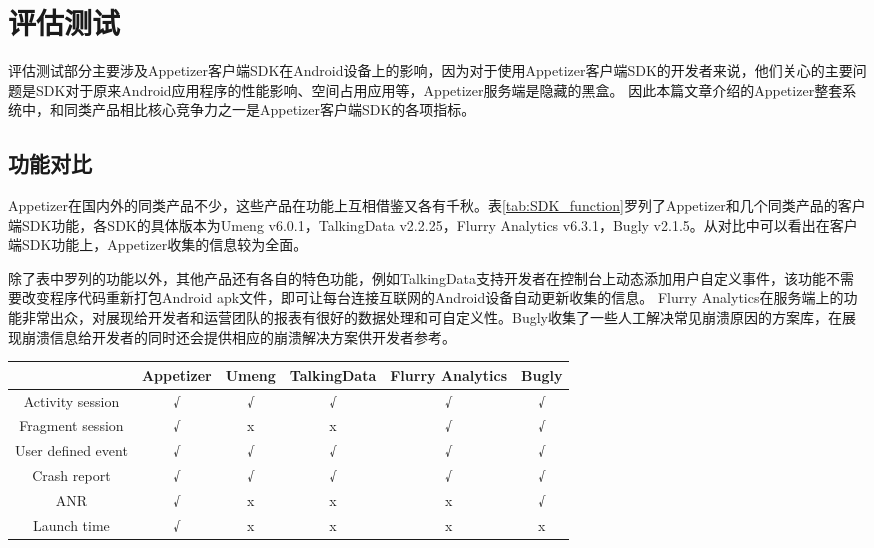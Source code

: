 
\chapter{评估测试}
\label{chap:evaluation}

评估测试部分主要涉及Appetizer客户端SDK在Android设备上的影响，因为对于使用Appetizer客户端SDK的开发者来说，他们关心的主要问题是SDK对于原来Android应用程序的性能影响、空间占用应用等，Appetizer服务端是隐藏的黑盒。
因此本篇文章介绍的Appetizer整套系统中，和同类产品相比核心竞争力之一是Appetizer客户端SDK的各项指标。

\section{功能对比}

Appetizer在国内外的同类产品不少，这些产品在功能上互相借鉴又各有千秋。表\ref{tab:SDK_function}罗列了Appetizer和几个同类产品的客户端SDK功能，各SDK的具体版本为Umeng v6.0.1，TalkingData v2.2.25，Flurry Analytics v6.3.1，Bugly v2.1.5。从对比中可以看出在客户端SDK功能上，Appetizer收集的信息较为全面。

除了表中罗列的功能以外，其他产品还有各自的特色功能，例如TalkingData支持开发者在控制台上动态添加用户自定义事件，该功能不需要改变程序代码重新打包Android apk文件，即可让每台连接互联网的Android设备自动更新收集的信息。
Flurry Analytics在服务端上的功能非常出众，对展现给开发者和运营团队的报表有很好的数据处理和可自定义性。Bugly收集了一些人工解决常见崩溃原因的方案库，在展现崩溃信息给开发者的同时还会提供相应的崩溃解决方案供开发者参考。

\begin{table}[!hpb]
	\centering
	\begin{tabular}{c c c c c c} \toprule
		 & Appetizer & Umeng & TalkingData & Flurry Analytics & Bugly\\ \midrule
		Activity session & √ & √ & √ & √ & √ \\
		Fragment session & √ & x & x & √ & √ \\
		User defined event & √ & √ & √ & √ & √ \\
		Crash report & √ & √ & √ & √ & √ \\
		ANR & √ & x & x & x & √ \\
		Launch time & √ & x & x & x & x \\ \bottomrule
	\end{tabular}
\end{table}

